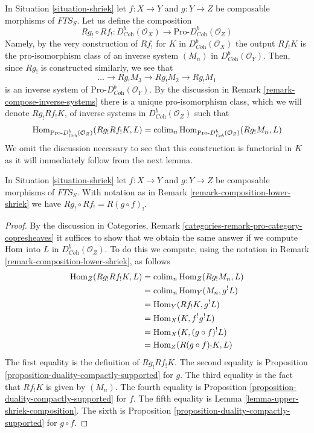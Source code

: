 \begin{remark}
\label{remark-composition-lower-shriek}
In Situation \ref{situation-shriek} let $f : X \to Y$ and $g : Y \to Z$
be composable morphisms of $\textit{FTS}_S$. Let us define the composition
$$
Rg_! \circ Rf_! :
D^b_{\textit{Coh}}(\mathcal{O}_X)
\longrightarrow
\text{Pro-}D^b_{\textit{Coh}}(\mathcal{O}_Z)
$$
Namely, by the very construction of $Rf_!$
for $K$ in $D^b_{\textit{Coh}}(\mathcal{O}_X)$
the output $Rf_!K$ is the pro-isomorphism class
of an inverse system $(M_n)$ in $D^b_{\textit{Coh}}(\mathcal{O}_Y)$.
Then, since $Rg_!$ is constructed similarly, we see that
$$
\ldots \to Rg_!M_3 \to Rg_!M_2 \to Rg_!M_1
$$
is an inverse system of $\text{Pro-}D^b_{\textit{Coh}}(\mathcal{O}_Y)$.
By the discussion in Remark \ref{remark-compose-inverse-systems}
there is a unique pro-isomorphism class, which we will denote
$Rg_! Rf_! K$, of inverse systems in $D^b_{\textit{Coh}}(\mathcal{O}_Z)$
such that
$$
\mathop{\mathrm{Hom}}\nolimits_{\text{Pro-}D^b_{\textit{Coh}}(\mathcal{O}_Z)}(Rg_!Rf_!K, L) =
\mathop{\mathrm{colim}}\nolimits_n \mathop{\mathrm{Hom}}\nolimits_{\text{Pro-}D^b_{\textit{Coh}}(\mathcal{O}_Z)}(Rg_!M_n, L)
$$
We omit the discussion necessary to see that this construction
is functorial in $K$ as it will immediately follow from the next lemma.
\end{remark}

\begin{lemma}
\label{lemma-composition-lower-shriek}
In Situation \ref{situation-shriek} let $f : X \to Y$ and $g : Y \to Z$
be composable morphisms of $\textit{FTS}_S$. With notation as in
Remark \ref{remark-composition-lower-shriek} we have
$Rg_! \circ Rf_! = R(g \circ f)_!$.
\end{lemma}

\begin{proof}
By the discussion in
Categories, Remark \ref{categories-remark-pro-category-copresheaves}
it suffices to show that we obtain the same answer if we compute
$\mathop{\mathrm{Hom}}\nolimits$ into $L$ in $D^b_{\textit{Coh}}(\mathcal{O}_Z)$. To do this
we compute, using the notation in
Remark \ref{remark-composition-lower-shriek}, as follows
\begin{align*}
\mathop{\mathrm{Hom}}\nolimits_Z(Rg_!Rf_!K, L)
& =
\mathop{\mathrm{colim}}\nolimits_n \mathop{\mathrm{Hom}}\nolimits_Z(Rg_!M_n, L) \\
& =
\mathop{\mathrm{colim}}\nolimits_n \mathop{\mathrm{Hom}}\nolimits_Y(M_n, g^!L) \\
& =
\mathop{\mathrm{Hom}}\nolimits_Y(Rf_!K, g^!L) \\
& =
\mathop{\mathrm{Hom}}\nolimits_X(K, f^!g^!L) \\
& =
\mathop{\mathrm{Hom}}\nolimits_X(K, (g \circ f)^!L) \\
& =
\mathop{\mathrm{Hom}}\nolimits_Z(R(g \circ f)_!K, L)
\end{align*}
The first equality is the definition of $Rg_!Rf_!K$. The second
equality is Proposition \ref{proposition-duality-compactly-supported}
for $g$.
The third equality is the fact that $Rf_!K$ is given by $(M_n)$.
The fourth equality is
Proposition \ref{proposition-duality-compactly-supported} for $f$.
The fifth equality is Lemma \ref{lemma-upper-shriek-composition}.
The sixth is 
Proposition \ref{proposition-duality-compactly-supported} for $g \circ f$.
\end{proof}

